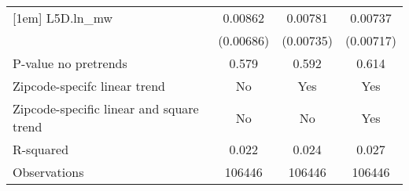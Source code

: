 {\begin{tabular}{l*{3}{c}}
[1em]
L5D.ln\_mw &  0.00862         &  0.00781         &  0.00737         \\
          &(0.00686)         &(0.00735)         &(0.00717)         \\
\hline
P-value no pretrends&    0.579         &    0.592         &    0.614         \\
Zipcode-specifc linear trend&       No         &      Yes         &      Yes         \\
Zipcode-specific linear and square trend&       No         &       No         &      Yes         \\
R-squared &    0.022         &    0.024         &    0.027         \\
Observations&   106446         &   106446         &   106446         \\
\hline\hline
\end{tabular}
}
